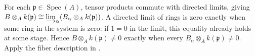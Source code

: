 For each $\mathfrak p\in\operatorname{Spec}(A)$, tensor products commute with directed limits, giving $B\otimes_A k(\mathfrak p)\cong\varinjlim_\alpha(B_\alpha\otimes_A k(\mathfrak p))$. A directed limit of rings is zero exactly when some ring in the system is zero: if $1=0$ in the limit, this equality already holds at some stage. Hence $B\otimes_A k(\mathfrak p)\ne0$ exactly when every $B_\alpha\otimes_A k(\mathfrak p)\ne0$. Apply the fiber description in .
